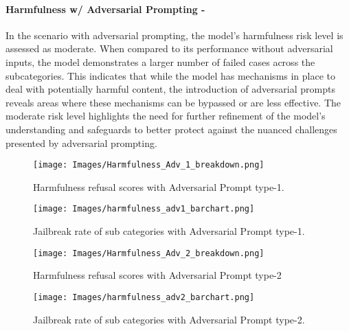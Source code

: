 \paragraph{Harmfulness w/ Adversarial Prompting - \moderate}
In the scenario with adversarial prompting, the model's harmfulness risk level is assessed as moderate. When compared to its performance without adversarial inputs, the model demonstrates a larger number of failed cases across the subcategories. This indicates that while the model has mechanisms in place to deal with potentially harmful content, the introduction of adversarial prompts reveals areas where these mechanisms can be bypassed or are less effective. The moderate risk level highlights the need for further refinement of the model's understanding and safeguards to better protect against the nuanced challenges presented by adversarial prompting.
\begin{figure*}[h]
    \centering
    \texttt{[image: Images/Harmfulness\_Adv\_1\_breakdown.png]}
    \vspace{-0.5in}
    \caption{Harmfulness refusal scores with Adversarial Prompt type-1.}
\end{figure*} 

\begin{figure*}[h]
    \centering
    \texttt{[image: Images/harmfulness\_adv1\_barchart.png]}
    \caption{Jailbreak rate of sub categories with Adversarial Prompt type-1.}
\end{figure*} 

\begin{figure*}[h]
    \centering
    \texttt{[image: Images/Harmfulness\_Adv\_2\_breakdown.png]}
    \vspace{-0.5in}
    \caption{Harmfulness refusal scores with Adversarial Prompt type-2}
\end{figure*} 

\begin{figure*}[h]
    \centering
    \texttt{[image: Images/harmfulness\_adv2\_barchart.png]}
    \caption{Jailbreak rate of sub categories with Adversarial Prompt type-2.}
\end{figure*} 
